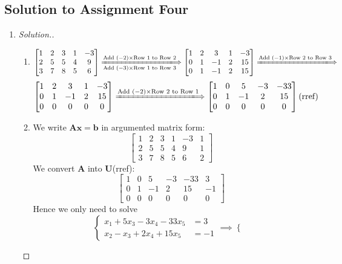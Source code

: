 \subsection{Solution to Assignment Four}
\begin{enumerate}
\item
\begin{proof}[Solution.]
\begin{enumerate}
\item
\[
\begin{bmatrix}
1&2&3&1&-3\\2&5&5&4&9\\3&7&8&5&6
\end{bmatrix}\xLongrightarrow[\text{Add $(-3)\times$Row 1 to Row 3}]{\text{Add $(-2)\times$Row 1 to Row 2}}
\begin{bmatrix}
1&2&3&1&-3\\0&1&-1&2&15\\0&1&-1&2&15
\end{bmatrix}\xLongrightarrow{\text{Add $(-1)\times$Row 2 to Row 3}}
\]
\[
\begin{bmatrix}
1&2&3&1&-3\\0&1&-1&2&15\\0&0&0&0&0
\end{bmatrix}
\xLongrightarrow{\text{Add $(-2)\times$Row 2 to Row 1}}
\begin{bmatrix}
1&0&5&-3&-33\\0&1&-1&2&15\\0&0&0&0&0
\end{bmatrix}\text{(rref)}
\]
\item
We write $\bm{Ax} = \bm b$ in argumented matrix form:
\[
\left[\begin{array}{ccccc|c}
1&2&3&1&-3&1\\2&5&5&4&9&1\\3&7&8&5&6&2
\end{array}\right]
\]
We convert $\bm A$ into $\bm U$(rref):
\[
\left[\begin{array}{ccccc|c}
1&0&5&-3&-33&3\\0&1&-1&2&15&-1\\0&0&0&0&0&0
\end{array}\right]
\]
Hence we only need to solve
\[
\left\{\begin{aligned}
x_1+5x_3-3x_4-33x_5&=3\\
x_2-x_3+2x_4+15x_5&=-1
\end{aligned}\right.
\implies
\left\{\begin{aligned}

\end{aligned}\]
\end{enumerate}
\end{proof}
\end{enumerate}
